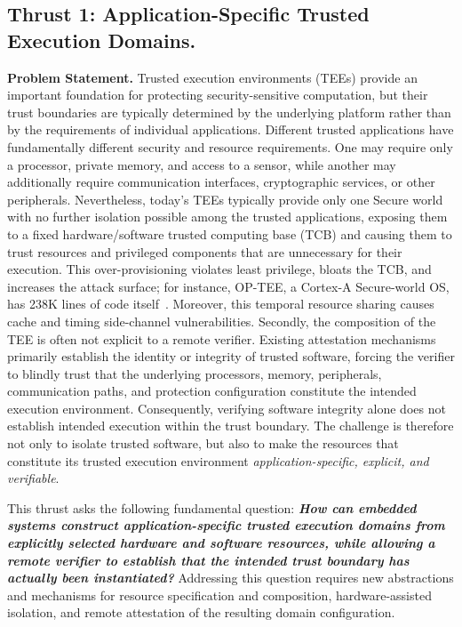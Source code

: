 \subsection{Thrust 1: Application-Specific Trusted Execution Domains.}
\label{sb:t1}

\textbf{Problem Statement.}
Trusted execution environments (TEEs) provide an important foundation for protecting security-sensitive computation, but their trust boundaries are typically determined by the underlying platform rather than by the requirements of individual applications.
Different trusted applications have fundamentally different security and resource requirements.
One may require only a processor, private memory, and access to a sensor, while another may additionally require communication interfaces, cryptographic services, or other peripherals.
Nevertheless, today's TEEs typically provide only one Secure world with no further isolation possible among the trusted applications, exposing them to a fixed hardware/software trusted computing base (TCB) and causing them to trust resources and privileged components that are unnecessary for their execution.
This over-provisioning violates least privilege, bloats the TCB, and increases the attack surface; for instance, OP-TEE, a Cortex-A Secure-world OS, has 238K lines of code itself~\cite{OP-TEE}.
Moreover, this temporal resource sharing causes cache and timing side-channel vulnerabilities.
Secondly, the composition of the TEE is often not explicit to a remote verifier.
Existing attestation mechanisms primarily establish the identity or integrity of trusted software, forcing the verifier to blindly trust that the underlying processors, memory, peripherals, communication paths, and protection configuration constitute the intended execution environment.
Consequently, verifying software integrity alone does not establish intended execution within the trust boundary.
The challenge is therefore not only to isolate trusted software, but also to make the resources that constitute its trusted execution environment \emph{application-specific, explicit, and verifiable}.

This thrust asks the following fundamental question: \textbf{\textit{How can embedded systems construct application-specific trusted execution domains from explicitly selected hardware and software resources, while allowing a remote verifier to establish that the intended trust boundary has actually been instantiated?}}
Addressing this question requires new abstractions and mechanisms for resource specification and composition, hardware-assisted isolation, and remote attestation of the resulting domain configuration. 


